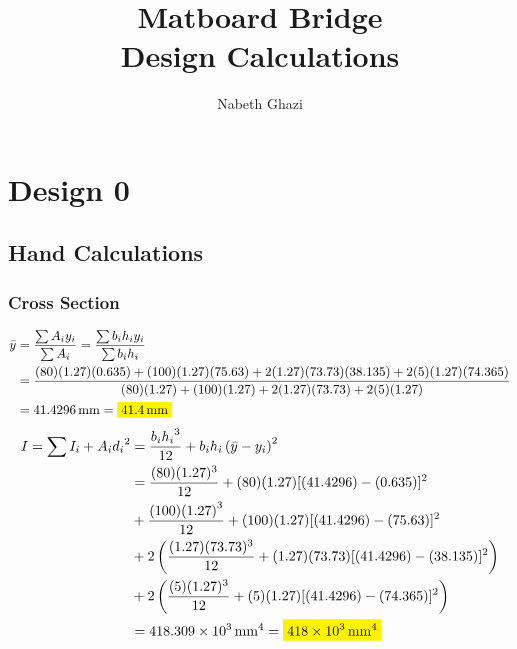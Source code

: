 \documentclass[11pt, fleqn]{article}
\newcommand{\mathhl}[1]{\colorbox{yellow}{$\displaystyle #1$}}
\begin{document}
\clearpage
{}
\title{Matboard Bridge\\ \textbf{Design Calculations}}
\author{Nabeth Ghazi}
\date{}
\maketitle

\tableofcontents

\clearpage
{}

\section{Design 0}

\subsection{Hand Calculations}

\setcounter{subsubsection}{-1}
\subsubsection{Cross Section}
\begin{align*}
    \bar{y} & = \frac{\sum{A_iy_i}}{\sum A_i} = \frac{\sum{b_ih_iy_i}}{\sum{b_ih_i}}                                                                    \\
            & = \frac{(80)(1.27)(0.635)+(100)(1.27)(75.63)+2(1.27)(73.73)(38.135)+2(5)(1.27)(74.365)}{(80)(1.27)+(100)(1.27)+2(1.27)(73.73)+2(5)(1.27)} \\
            & = \SI{41.4296}{\mm} = \mathhl{\SI{41.4}{\mm}}
\end{align*}
\begin{align*}
    I = \sum{I_i+A_i{d_i}^2} & = \frac{b_i{h_i}^3}{12}+b_ih_i\left(\bar{y}-y_i\right)^2                      \\
                             & = \frac{(80)(1.27)^3}{12}+(80)(1.27)[(41.4296)-(0.635)]^2                     \\
                             & +\frac{(100){(1.27)}^3}{12}+(100)(1.27)[(41.4296)-(75.63)]^2                  \\
                             & +2\left(\frac{(1.27)(73.73)^3}{12}+(1.27)(73.73)[(41.4296)-(38.135)]^2\right) \\
                             & +2\left(\frac{(5)(1.27)^3}{12}+(5)(1.27)[(41.4296)-(74.365)]^2\right)         \\
                             & = \SI{418.309e3}{\mm^4} = \mathhl{\SI{418e3}{\mm^4}}
\end{align*}
\end{document}
